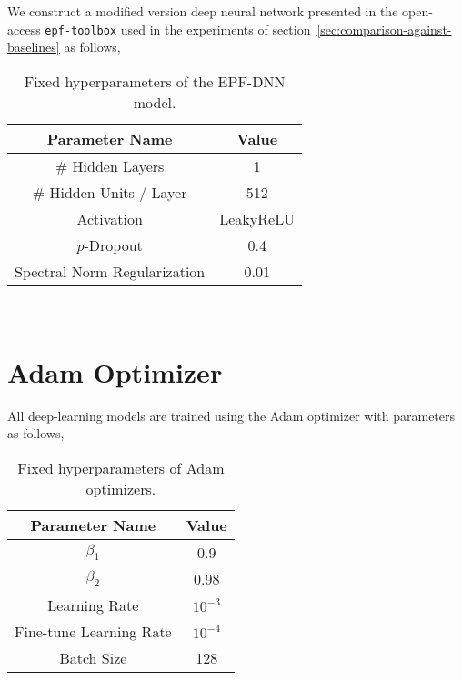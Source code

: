 We construct a modified version deep neural network presented in the open-access \texttt{epf-toolbox} used in the
experiments of section~\ref{sec:comparison-against-baselines} as follows,

\begin{table}[htb]
    \caption[EPF-DNN Hyperparameters]{
        Fixed hyperparameters of the EPF-DNN model.
    }
    \begin{center}
        \begin{tabular}{|c|c|} \hline
        Parameter Name & Value  \\	%
        \hline \hline
        \# Hidden Layers             & 1 \\ \hline
        \# Hidden Units / Layer      & 512 \\ \hline
        Activation                   & LeakyReLU \\ \hline
        $p$-Dropout                  & 0.4 \\ \hline
        Spectral Norm Regularization & 0.01 \\ \hline
        \end{tabular}
        \\ \rule{0mm}{5mm}
    \end{center}
    \label{tab:epf_dnn_params}
\end{table}

\section{Adam Optimizer}\label{sec:adam-optimizer}

All deep-learning models are trained using the Adam optimizer with parameters as follows,

\begin{table}[htb]
    \caption[Adam Hyperparameters]{
        Fixed hyperparameters of Adam optimizers.
    }
    \begin{center}
        \begin{tabular}{|c|c|} \hline
        Parameter Name & Value  \\	%
        \hline \hline
        $\beta_1$               & 0.9       \\ \hline
        $\beta_2$               & 0.98      \\ \hline
        Learning Rate           & $10^{-3}$ \\ \hline
        Fine-tune Learning Rate & $10^{-4}$ \\ \hline
        Batch Size              & 128       \\ \hline
        \end{tabular}
        \\ \rule{0mm}{5mm}
    \end{center}
    \label{tab:adam_params}
\end{table}

